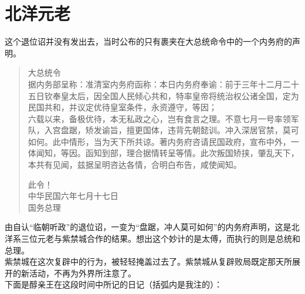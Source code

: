 \fancyhead[RO]{} %
\fancyhead[LE]{} %
\chapter*{北洋元老}
\thispagestyle{empty}
这个退位诏并没有发出去，当时公布的只有裹夹在大总统命令中的一个内务府的声明。\\

\begin{quote}
	大总统令\\

据内务部呈称：准清室内务府函称：本日内务府奉谕：前于三年十二月二十五日钦奉皇太后，因全国人民倾心共和，特率皇帝将统治权公诸全国，定为民国共和，并议定优待皇室条件，永资遵守，等因；\\

六载以来，备极优待，本无私政之心，岂有食言之理。不意七月一号率领军队，入宫盘踞，矫发谕旨，擅更国体，违背先朝懿训。冲入深居官禁，莫可如何。此中情形，当为天下所共谅。著内务府咨请民国政府，宣布中外，一体闻知，等因。函知到部，理合据情转呈等情。此次叛国矫挟，肇乱天下，本共有见闻，兹据呈明咨达各情，合明白布告，咸使闻知。\\

\begin{flushright}
	此令！\\

中华民国六年七月十七日\\

国务总理
\end{flushright}
\end{quote}

由自认“临朝听政”的退位诏，一变为“盘踞，冲人莫可如何”的内务府声明，这是北洋系三位元老与紫禁城合作的结果。想出这个妙计的是太傅，而执行的则是总统和总理。\\

紫禁城在这次复辟中的行为，被轻轻掩盖过去了。紫禁城从复辟败局既定那天所展开的新活动，不再为外界所注意了。\\

下面是醇亲王在这段时间中所记的日记（括弧内是我注的）：\\

